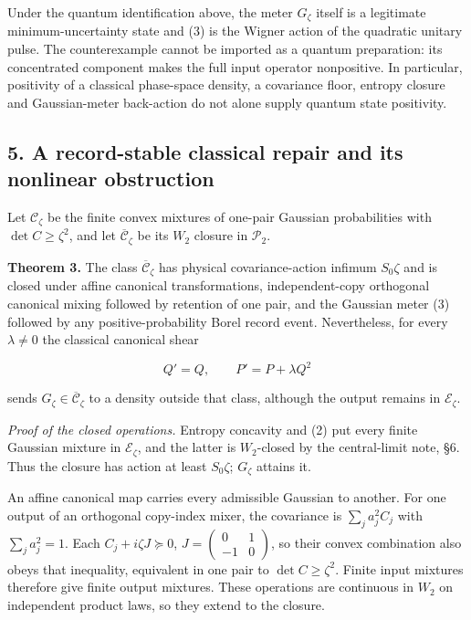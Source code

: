 \documentclass[11pt,a4paper]{article}
\begin{document}
Under the quantum identification above, the meter \(G_\zeta\) itself is
a legitimate minimum-uncertainty state and (3) is the Wigner action of
the quadratic unitary pulse. The counterexample cannot be imported as a
quantum preparation: its concentrated component makes the full input
operator nonpositive. In particular, positivity of a classical
phase-space density, a covariance floor, entropy closure and
Gaussian-meter back-action do not alone supply quantum state positivity.

\hypertarget{a-record-stable-classical-repair-and-its-nonlinear-obstruction}{%
\subsection{5. A record-stable classical repair and its nonlinear
obstruction}\label{a-record-stable-classical-repair-and-its-nonlinear-obstruction}}

Let \(\mathcal C_\zeta\) be the finite convex mixtures of one-pair
Gaussian probabilities with \(\det C\ge\zeta^2\), and let
\(\overline{\mathcal C}_\zeta\) be its \(W_2\) closure in
\(\mathcal P_2\).

\textbf{Theorem 3.} The class \(\overline{\mathcal C}_\zeta\) has
physical covariance-action infimum \(S_0\zeta\) and is closed under
affine canonical transformations, independent-copy orthogonal canonical
mixing followed by retention of one pair, and the Gaussian meter (3)
followed by any positive-probability Borel record event. Nevertheless,
for every \(\lambda\ne0\) the classical canonical shear

\[
 Q'=Q,\qquad P'=P+\lambda Q^2 \tag{16}
\]

sends \(G_\zeta\in\overline{\mathcal C}_\zeta\) to a density outside
that class, although the output remains in \(\mathcal E_\zeta\).

\emph{Proof of the closed operations.} Entropy concavity and (2) put
every finite Gaussian mixture in \(\mathcal E_\zeta\), and the latter is
\(W_2\)-closed by the central-limit note, §6. Thus the closure has
action at least \(S_0\zeta\); \(G_\zeta\) attains it.

An affine canonical map carries every admissible Gaussian to another.
For one output of an orthogonal copy-index mixer, the covariance is
\(\sum_j a_j^2C_j\) with \(\sum_j a_j^2=1\). Each
\(C_j+i\zeta J\succeq0\), \(J=\begin{pmatrix}0&1\\-1&0\end{pmatrix}\),
so their convex combination also obeys that inequality, equivalent in
one pair to \(\det C\ge\zeta^2\). Finite input mixtures therefore give
finite output mixtures. These operations are continuous in \(W_2\) on
independent product laws, so they extend to the closure.
\end{document}
